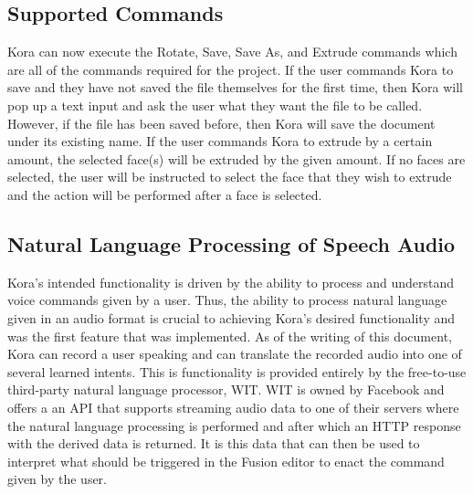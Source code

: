 \documentclass[onecolumn, draftclsnofoot,10pt, compsoc]{IEEEtran}
\begin{document}
	\subsection{Supported Commands}
		Kora can now execute the Rotate, Save, Save As, and Extrude commands which are all of the commands required for the project.
		If the user commands Kora to save and they have not saved the file themselves for the first time, then Kora will pop up a text input and ask the user what they want the file to be called.
		However, if the file has been saved before, then Kora will save the document under its existing name.
		If the user commands Kora to extrude by a certain amount, the selected face(s) will be extruded by the given amount.
		If no faces are selected, the user will be instructed to select the face that they wish to extrude and the action will be performed after a face is selected.
		
	\subsection{Natural Language Processing of Speech Audio}
		Kora's intended functionality is driven by the ability to process and understand voice commands given by a user.
		Thus, the ability to process natural language given in an audio format is crucial to achieving Kora's desired functionality and was the first feature that was implemented.
		As of the writing of this document, Kora can record a user speaking and can translate the recorded audio into one of several learned intents.
		This is functionality is provided entirely by the free-to-use third-party natural language processor, WIT.
		WIT is owned by Facebook and offers a an API that supports streaming audio data to one of their servers where the natural language processing is performed and after which an HTTP response with the derived data is returned.
		It is this data that can then be used to interpret what should be triggered in the Fusion editor to enact the command given by the user.
\end{document}
